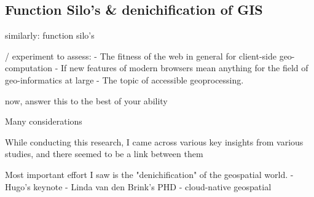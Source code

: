 


\subsection*{Function Silo's \& denichification of GIS}

similarly: function silo's 

/ experiment to assess: 
- The fitness of the web in general for client-side geo-computation
- If new features of modern browsers mean anything for the field of geo-informatics at large 
- The topic of accessible geoprocessing.

now, answer this to the best of your ability

Many considerations


While conducting this research, I came across various key insights from various studies, and there seemed to be a link between them 

Most important effort I saw is the "denichification" of the geospatial world.
- Hugo's keynote
- Linda van den Brink's PHD
- cloud-native geospatial 

